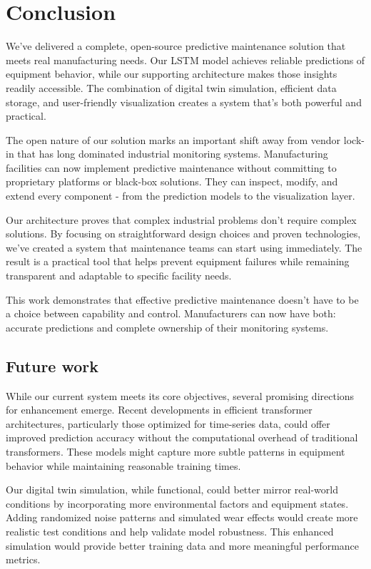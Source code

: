 \chapter{Conclusion}
\label{chap:conclusion}
\setlength{\parskip}{1em}

We've delivered a complete, open-source predictive maintenance solution that meets real manufacturing needs. Our LSTM model achieves reliable predictions of equipment behavior, while our supporting architecture makes those insights readily accessible. The combination of digital twin simulation, efficient data storage, and user-friendly visualization creates a system that's both powerful and practical.

The open nature of our solution marks an important shift away from vendor lock-in that has long dominated industrial monitoring systems. Manufacturing facilities can now implement predictive maintenance without committing to proprietary platforms or black-box solutions. They can inspect, modify, and extend every component - from the prediction models to the visualization layer.

Our architecture proves that complex industrial problems don't require complex solutions. By focusing on straightforward design choices and proven technologies, we've created a system that maintenance teams can start using immediately. The result is a practical tool that helps prevent equipment failures while remaining transparent and adaptable to specific facility needs.

This work demonstrates that effective predictive maintenance doesn't have to be a choice between capability and control. Manufacturers can now have both: accurate predictions and complete ownership of their monitoring systems.

\section{Future work}

While our current system meets its core objectives, several promising directions for enhancement emerge. Recent developments in efficient transformer architectures, particularly those optimized for time-series data, could offer improved prediction accuracy without the computational overhead of traditional transformers. These models might capture more subtle patterns in equipment behavior while maintaining reasonable training times.

Our digital twin simulation, while functional, could better mirror real-world conditions by incorporating more environmental factors and equipment states. Adding randomized noise patterns and simulated wear effects would create more realistic test conditions and help validate model robustness. This enhanced simulation would provide better training data and more meaningful performance metrics.

